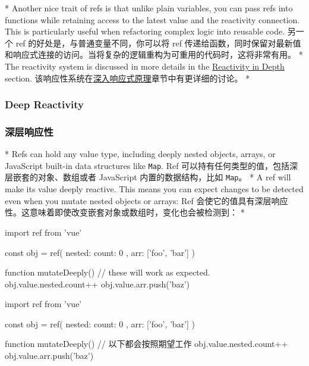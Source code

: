 \begin{paracol}{2}
\switchcolumn[0]*%
Another nice trait of refs is that unlike plain variables, you can pass
refs into functions while retaining access to the latest value and the
reactivity connection. This is particularly useful when refactoring
complex logic into reusable code.
\switchcolumn
另一个 ref 的好处是，与普通变量不同，你可以将 ref
传递给函数，同时保留对最新值和响应式连接的访问。当将复杂的逻辑重构为可重用的代码时，这将非常有用。
\switchcolumn[0]*%
The reactivity system is discussed in more details in the
\href{https://vuejs.org/guide/extras/reactivity-in-depth.html}{Reactivity
in Depth} section.
\switchcolumn
该响应性系统在\href{https://cn.vuejs.org/guide/extras/reactivity-in-depth.html}{深入响应式原理}章节中有更详细的讨论。
\switchcolumn[0]*%
\subsubsection{Deep Reactivity}
\switchcolumn
\subsubsection{深层响应性}
\switchcolumn[0]*%
Refs can hold any value type, including deeply nested objects, arrays,
or JavaScript built-in data structures like \texttt{Map}.
\switchcolumn
Ref 可以持有任何类型的值，包括深层嵌套的对象、数组或者 JavaScript
内置的数据结构，比如 \texttt{Map}。
\switchcolumn[0]*%
A ref will make its value deeply reactive. This means you can expect
changes to be detected even when you mutate nested objects or arrays:
\switchcolumn
Ref
会使它的值具有深层响应性。这意味着即使改变嵌套对象或数组时，变化也会被检测到：
\switchcolumn[0]*%
\begin{codeHtml}
import { ref } from 'vue'

const obj = ref({
    nested: { count: 0 },
    arr: ['foo', 'bar']
})

function mutateDeeply() {
    // these will work as expected.
    obj.value.nested.count++
    obj.value.arr.push('baz')
}
\end{codeHtml}  
\switchcolumn
\begin{codeHtml}
import { ref } from 'vue'

const obj = ref({
    nested: { count: 0 },
    arr: ['foo', 'bar']
})

function mutateDeeply() {
    // 以下都会按照期望工作
    obj.value.nested.count++
    obj.value.arr.push('baz')
}
\end{codeHtml}  


\end{paracol}
